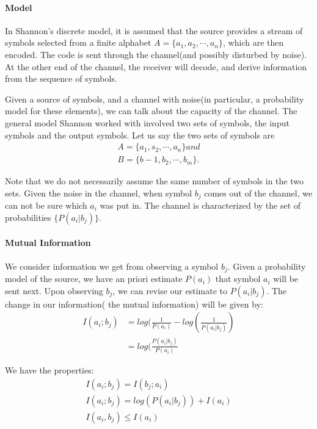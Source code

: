 \documentclass[10 pt,final]{article}
\newcommand{\impo}[1]{{\color{magenta} #1}}
\begin{document}
\paragraph{Model} In Shannon's discrete model, it is assumed that the source provides a stream of symbols selected from a finite alphabet $A=\{a_1, a_2, \cdots, a_n\}$, which are then encoded. The code is sent through the channel(and possibly disturbed by noise). At the other end of the channel, the receiver will decode, and derive information from the sequence of symbols. 

Given a source of symbols, and a channel with noise(in particular, a probability model for these elements), we can talk about the capacity of the channel. The general model Shannon worked with involved two sets of symbols, the input symbols and the output symbols. Let us say the two sets of symbols are
\begin{align*}
A = \{a_1, s_2, \cdots, a_n\} and  \\
B = \{b-1, b_2, \cdots, b_m\}.
\end{align*}

Note that we do not necessarily assume the same number of symbols in the two sets. Given the noise in the channel, when symbol $b_j$ comes out of the channel, we can not be sure which $a_i$ was put in. The channel is characterized by the set of probabilities $\{P(a_i|b_j)\}$.

\paragraph{Mutual Information} We consider information we get from observing a symbol $b_j$. Given a probability model of the source, we have an priori estimate $P(a_i)$ that symbol $a_i$ will be sent next. Upon observing $b_j$, we can revise our estimate to $P(a_i|b_j)$. The change in our information(\impo{the mutual information}) will be given by:
\begin{align*}
I(a_i;b_j) & = log(\frac{1}{P(a_i)} - log(\frac{1}{P(a_i|b_j)}) \\
& = log(\frac{P(a_i|b_j)}{P(a_i)}
\end{align*} 

We have the properties:
\begin{align*}
I(a_i; b_j) = I(b_j; a_i) \\
I(a_i; b_j) = log(P(a_i|b_j)) + I(a_i) \\
I(a_i, b_j) \leq I(a_i)
\end{align*}
\end{document}
